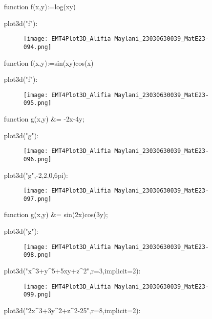 \documentclass{article}
\begin{document}
\>function f(x,y):=log(x\*y)

\>plot3d("f"):


\begin{figure}
    \centering
    \texttt{[image: EMT4Plot3D\_Alifia Maylani\_23030630039\_MatE23-094.png]}
    \caption{}
    \label{fig:enter-label}
\end{figure}

\>function f(x,y):=sin(x\*y)\*cos(x)

\>plot3d("f"):


\begin{figure}
    \centering
    \texttt{[image: EMT4Plot3D\_Alifia Maylani\_23030630039\_MatE23-095.png]}
    \caption{}
    \label{fig:enter-label}
\end{figure}

\>function g(x,y) &= -2\*x-4\*y;

\>plot3d("g"):


\begin{figure}
    \centering
    \texttt{[image: EMT4Plot3D\_Alifia Maylani\_23030630039\_MatE23-096.png]}
    \caption{}
    \label{fig:enter-label}
\end{figure}

\>plot3d("g",-2,2,0,6\*pi):


\begin{figure}
    \centering
    \texttt{[image: EMT4Plot3D\_Alifia Maylani\_23030630039\_MatE23-097.png]}
    \caption{}
    \label{fig:enter-label}
\end{figure}

\>function g(x,y) &= sin(2\*x)\*cos(3\*y);

\>plot3d("g"):


\begin{figure}
    \centering
    \texttt{[image: EMT4Plot3D\_Alifia Maylani\_23030630039\_MatE23-098.png]}
    \caption{}
    \label{fig:enter-label}
\end{figure}

\>plot3d("x^3+y^5+5\*x\*y+z^2",r=3,implicit=2):


\begin{figure}
    \centering
    \texttt{[image: EMT4Plot3D\_Alifia Maylani\_23030630039\_MatE23-099.png]}
    \caption{}
    \label{fig:enter-label}
\end{figure}

\>plot3d("2\*x^3+3\*y^2+z^2-25",r=8,implicit=2):
\end{document}
